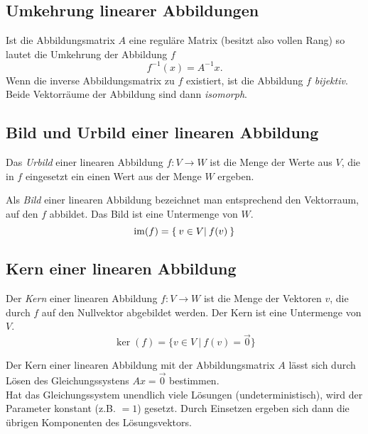\subsection{Umkehrung linearer Abbildungen}
\label{sub:umkehrung_linearer_abbildungen}

Ist die Abbildungsmatrix $A$ eine reguläre Matrix (besitzt also vollen Rang) so lautet die Umkehrung der Abbildung $f$
\begin{equation}
	f^{-1}(x) = A^{-1}x.
\end{equation}
Wenn die inverse Abbildungsmatrix zu $f$ existiert, ist die Abbildung $f$ \emph{bijektiv}. Beide Vektorräume der 
Abbildung sind dann \emph{isomorph}.

\subsection{Bild und Urbild einer linearen Abbildung}
\label{sub:bild_und_urbild_einer_linearen_abbildung}

Das \emph{Urbild} einer linearen Abbildung $f : V \rightarrow W$ ist die Menge der Werte aus $V$, die in $f$ eingesetzt
ein einen Wert aus der Menge $W$ ergeben.

Als \emph{Bild} einer linearen Abbildung bezeichnet man entsprechend den Vektorraum, auf den $f$ abbildet. 
Das Bild ist eine Untermenge von $W$.
\begin{equation}
	\operatorname{im}(f) = \{ \: v \in V | \: f(v) \:  \}
\end{equation}

\subsection{Kern einer linearen Abbildung} 
\label{sub:kern_einer_linearen_abbildung}

Der \emph{Kern} einer linearen Abbildung $f : V \rightarrow W$ ist die Menge der Vektoren $v$, die durch $f$ auf den 
Nullvektor abgebildet werden. Der Kern ist eine Untermenge von $V$.
\begin{equation}
	\ker(f) = \{v \in V \: | \: f(v) = \overrightarrow{0}\}
\end{equation}

Der Kern einer linearen Abbildung mit der Abbildungsmatrix $A$ lässt sich durch Lösen des 
Gleichungssystens $Ax = \overrightarrow{0}$ bestimmen. \\
Hat das Gleichungssystem unendlich viele Lösungen
(undeterministisch), wird der Parameter konstant (z.B. $=1$) gesetzt. Durch Einsetzen ergeben sich dann die
übrigen Komponenten des Lösungsvektors.

